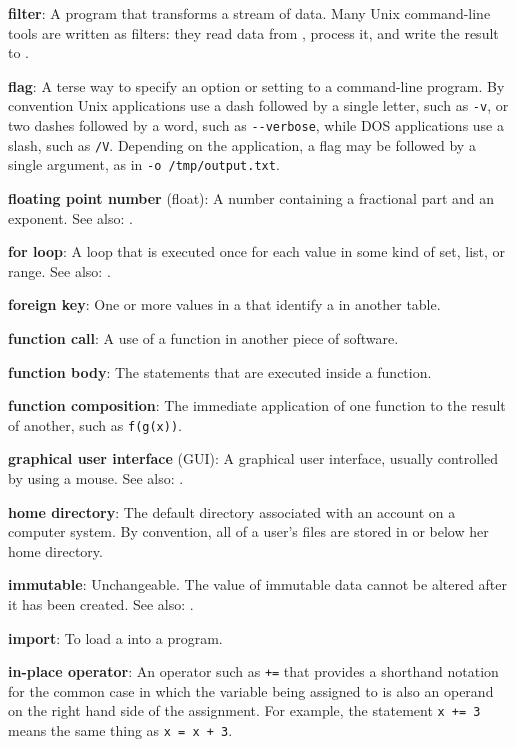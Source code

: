 \documentclass{book}
\begin{document}
\textbf{filter}: A program that transforms a stream of data. Many Unix
command-line tools are written as filters: they read data from
, process it, and write the
result to .

\textbf{flag}: A terse way to specify an option or setting to a
command-line program. By convention Unix applications use a dash
followed by a single letter, such as \texttt{-v}, or two dashes followed
by a word, such as \texttt{-{}-verbose}, while DOS applications use a
slash, such as \texttt{/V}. Depending on the application, a flag may be
followed by a single argument, as in \texttt{-o /tmp/output.txt}.

\textbf{floating point number} (float): A number containing a fractional
part and an exponent. See also: .

\textbf{for loop}: A loop that is executed once for each value in some
kind of set, list, or range. See also: .

\textbf{foreign key}: One or more values in a
 that identify a
 in another table.

\textbf{function call}: A use of a function in another piece of
software.

\textbf{function body}: The statements that are executed inside a
function.

\textbf{function composition}: The immediate application of one function
to the result of another, such as \texttt{f(g(x))}.

\textbf{graphical user interface} (GUI): A graphical user interface,
usually controlled by using a mouse. See also:
.

\textbf{home directory}: The default directory associated with an
account on a computer system. By convention, all of a user's files are
stored in or below her home directory.

\textbf{immutable}: Unchangeable. The value of immutable data cannot be
altered after it has been created. See also:
.

\textbf{import}: To load a  into a program.

\textbf{in-place operator}: An operator such as \texttt{+=} that
provides a shorthand notation for the common case in which the variable
being assigned to is also an operand on the right hand side of the
assignment. For example, the statement \texttt{x += 3} means the same
thing as \texttt{x = x + 3}.
\end{document}
